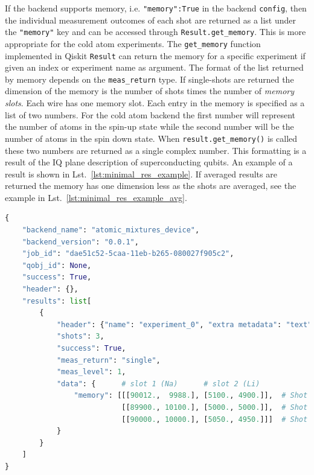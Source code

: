 \documentclass[a4paper, 10pt]{article}
\newcommand{\co}[1]{\texttt{#1}}
\begin{document}
If the backend supports memory, i.e. \co{"memory":True} in the backend \co{config}, then the individual measurement outcomes of each shot are returned as a list under the \co{"memory"} key and can be accessed through \co{Result.get\_memory}.
This is more appropriate for the cold atom experiments.
The \co{get\_memory} function implemented in Qiskit \co{Result} can return the memory for a specific experiment if given an index or experiment name as argument.
The format of the list returned by memory depends on the \co{meas\_return} type. If single-shots are returned the dimension of the memory is the number of shots times the number of \emph{memory slots}.
Each wire has one memory slot.
Each entry in the memory is specified as a list of two numbers.
For the cold atom backend the first number will represent the number of atoms in the spin-up state while the second number will be the number of atoms in the spin down state.
When \co{result.get\_memory()} is called these two numbers are returned as a single complex number. This formatting is a result of the IQ plane description of superconducting qubits.
An example of a result is shown in Lst.~\ref{lst:minimal_res_example}.
If averaged results are returned the memory has one dimension less as the shots are averaged, see the example in Lst.~\ref{lst:minimal_res_example_avg}.

\begin{minipage}{\linewidth}
\begin{lstlisting}[language=Python, caption = Example of a result returned by the NaLi device backend as a Json dictionary. The result has one experiment (namely \co{experiment\_0} which matches the name in Lst.~\ref{lst:circuit_json_example}) with three shots and two wires (one for Na and one for Li). In the first shot there are 90012 Na atoms in the spin-up state and 9988 in the spin-down state., label = {lst:minimal_res_example}]
{
    "backend_name": "atomic_mixtures_device",
    "backend_version": "0.0.1",
    "job_id": "dae51c52-5caa-11eb-b265-080027f905c2",
    "qobj_id": None,
    "success": True,
    "header": {},
    "results": list[
        {   
            "header": {"name": "experiment_0", "extra metadata": "text"},
            "shots": 3,
            "success": True,
            "meas_return": "single",
            "meas_level": 1,
            "data": {      # slot 1 (Na)      # slot 2 (Li)
                "memory": [[[90012.,  9988.], [5100., 4900.]],  # Shot 1
                           [[89900., 10100.], [5000., 5000.]],  # Shot 2
                           [[90000., 10000.], [5050., 4950.]]]  # Shot 3
            }
        }
    ]
}
\end{lstlisting}
\end{minipage}
\end{document}
